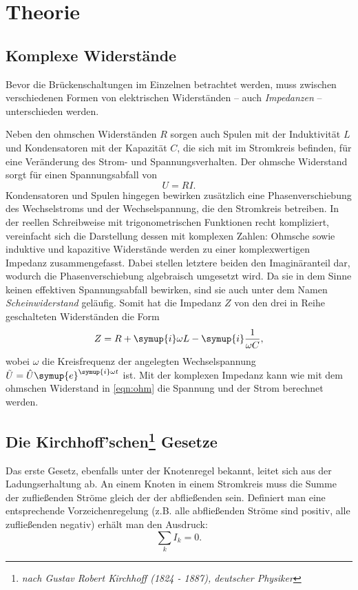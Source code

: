 \section{Theorie}
\label{sec:Theorie}
\subsection{Komplexe Widerstände}
Bevor die Brückenschaltungen im Einzelnen betrachtet werden, muss zwischen verschiedenen Formen von elektrischen Widerständen -- 
auch \textit{Impedanzen} -- unterschieden werden. 

Neben den ohmschen Widerständen $R$ sorgen auch Spulen mit der Induktivität $L$ und Kondensatoren mit der Kapazität $C$, 
die sich mit im Stromkreis befinden, für eine Veränderung des Strom- und Spannungsverhalten. 
Der ohmsche Widerstand sorgt für einen Spannungsabfall von 
\begin{equation}
    U=RI .
    \label{eqn:ohm}
\end{equation}
Kondensatoren und Spulen hingegen bewirken zusätzlich eine Phasenverschiebung des Wechselstroms und der Wechselspannung,
die den Stromkreis betreiben. 
In der reellen Schreibweise mit trigonometrischen Funktionen recht kompliziert, vereinfacht sich die Darstellung dessen 
mit komplexen Zahlen: 
Ohmsche sowie induktive und kapazitive Widerstände werden zu einer komplexwertigen Impedanz zusammengefasst. 
Dabei stellen letztere beiden den Imaginäranteil dar, wodurch die Phasenverschiebung algebraisch umgesetzt wird. 
Da sie in dem Sinne keinen effektiven Spannungsabfall bewirken, sind sie auch unter dem Namen \textit{Scheinwiderstand} geläufig.
Somit hat die Impedanz $Z$ von den drei in Reihe geschalteten Widerständen die Form 
\begin{equation}
    Z = R + \symup{i}\omega L - \symup{i}\frac{1}{\omega C} ,
    \label{eqn:impedanz}
\end{equation}
wobei $\omega$ die Kreisfrequenz der angelegten Wechselspannung $\tilde{U} = \hat{U} \symup{e}^{\symup{i}\omega t}$ ist.
Mit der komplexen Impedanz kann wie mit dem ohmschen Widerstand in \eqref{eqn:ohm} die Spannung und der Strom berechnet werden. 

\subsection{Die Kirchhoff'schen\footnote{\textit{nach Gustav Robert Kirchhoff (1824 - 1887), deutscher Physiker}} Gesetze}
Das erste Gesetz, ebenfalls unter der Knotenregel bekannt, leitet sich aus der Ladungserhaltung ab. 
An einem Knoten in einem Stromkreis muss die Summe der zufließenden Ströme gleich der der abfließenden sein. 
Definiert man eine entsprechende Vorzeichenregelung (z.B. alle abfließenden Ströme sind positiv, alle zufließenden negativ) 
erhält man den Ausdruck: 
\begin{equation}
    \sum_k I_k=0 .
    \label{eqn:kirchhoff1}
\end{equation}

